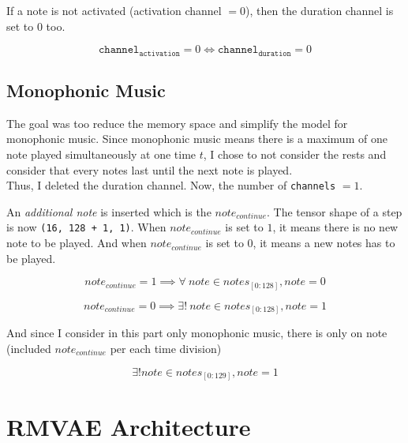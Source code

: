 \documentclass[12pt]{report}
\begin{document}
If a note is not activated (activation channel $ = 0$), then the duration channel is set to $0$ too.

\begin{equation}
    \texttt{channel}_{\texttt{activation}} = 0 \iff \texttt{channel}_{\texttt{duration}} = 0
\end{equation}

\subsection{Monophonic Music}
\label{sec:mono}

The goal was too reduce the memory space and simplify the model for monophonic music.
Since monophonic music means there is a maximum of one note played simultaneously at one time $t$, I chose to not consider the rests and consider that every notes last until the next note is played.\\
Thus, I deleted the duration channel.
Now, the number of \texttt{channels} $ = 1$.

An \textit{additional note} is inserted which is the $note_{continue}$.
The tensor shape of a step is now \texttt{(16, 128 + 1, 1)}.
When $note_{continue}$ is set to $1$, it means there is no new note to be played.
And when $note_{continue}$ is set to $0$, it means a new notes has to be played.

\begin{equation}
    note_{continue} = 1 \implies \forall~ note \in notes_{[0:128]}, note = 0
\end{equation}

\begin{equation}
    note_{continue} = 0 \implies \exists!~ note \in notes_{[0:128]}, note = 1
\end{equation}

And since I consider in this part only monophonic music, there is only on note (included $note_{continue}$ per each time division)

\begin{equation}
    \exists! note \in notes_{[0:129]}, note = 1
\end{equation}


\section{RMVAE Architecture}
\label{sec:rmvae}
\end{document}
